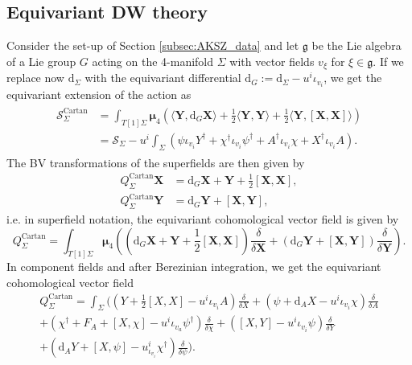 \documentclass[11pt,colorinlistoftodos]{amsart}
\numberwithin{equation}{subsection}
\theoremstyle{plain}
\theoremstyle{definition}
\theoremstyle{remark}
\newcommand{\dd}{{\mathrm{d}}}
\newcommand{\calS}{\mathcal{S}}
\begin{document}


\subsection{Equivariant DW theory}
Consider the set-up of Section \ref{subsec:AKSZ_data} and let $\mathfrak{g}$ be the Lie algebra of a Lie group $G$ acting on the 4-manifold $\Sigma$ with vector fields $v_\xi$ for $\xi\in\mathfrak{g}$. If we replace now $\dd_\Sigma$ with the equivariant differential $\dd_G:=\dd_\Sigma-u^i\iota_{v_i}$, we get the equivariant extension of the action as 
\begin{align}
    \begin{split}
        \calS^\mathrm{Cartan}_\Sigma&=\int_{T[1]\Sigma}\boldsymbol{\mu}_4\left(\langle \mathbf{Y},\dd_G\mathbf{X}\rangle+\frac{1}{2}\langle\mathbf{Y},\mathbf{Y}\rangle+\frac{1}{2}\langle\mathbf{Y},[\mathbf{X},\mathbf{X}]\rangle\right)\\
        &=\calS_\Sigma-u^i\int_\Sigma\left(\psi\iota_{v_i}Y^\dagger+\chi^\dagger\iota_{v_i}\psi^\dagger+A^\dagger\iota_{v_i}\chi+X^\dagger\iota_{v_i}A\right).
    \end{split}
\end{align}
The BV transformations of the superfields are then given by 
\begin{align}
    Q^\mathrm{Cartan}_\Sigma\mathbf{X}&=\dd_G\mathbf{X}+\mathbf{Y}+\frac{1}{2}[\mathbf{X},\mathbf{X}],\\
    Q^\mathrm{Cartan}_\Sigma\mathbf{Y}&=\dd_G\mathbf{Y}+[\mathbf{X},\mathbf{Y}],
\end{align}
i.e. in superfield notation, the equivariant cohomological vector field is given by 
\begin{equation}
    \label{eq:equivariant_cohomological_vector_field}
    Q^\mathrm{Cartan}_{\Sigma}=\int_{T[1]\Sigma}\boldsymbol{\mu}_4\left(\left(\dd_G\mathbf{X}+\mathbf{Y}+\frac{1}{2}[\mathbf{X},\mathbf{X}]\right)\frac{\delta}{\delta\mathbf{X}}+\left(\dd_G\mathbf{Y}+[\mathbf{X},\mathbf{Y}]\right)\frac{\delta}{\delta\mathbf{Y}}\right).
\end{equation}
In component fields and after Berezinian integration, we get the equivariant cohomological vector field
\begin{multline}
    Q^\mathrm{Cartan}_\Sigma=\int_\Sigma\Bigg(\left(Y+\frac{1}{2}[X,X]-u^i\iota_{v_i}A\right)\frac{\delta}{\delta X}+(\psi+\dd_AX-u^i\iota_{v_i}\chi)\frac{\delta}{\delta A}\\+(\chi^\dagger+F_A+[X,\chi]-u^i\iota_{v_a}\psi^\dagger)\frac{\delta}{\delta\chi}+([X,Y]-u^i\iota_{v_i}\psi)\frac{\delta}{\delta Y}\\+(\dd_AY+[X,\psi]-u^i_{\iota_{v_i}}\chi^\dagger)\frac{\delta}{\delta \psi}\Bigg).
\end{multline}
\end{document}
